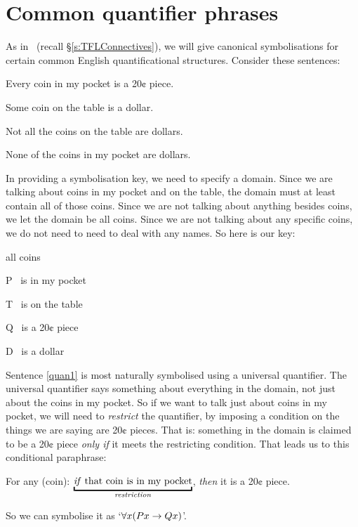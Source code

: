 \section{Common quantifier phrases}
As in \TFL\ (recall §\ref{s:TFLConnectives}), we will give canonical symbolisations for certain common English quantificational structures.
Consider these sentences:
	\begin{earg}
		\item[\ex{quan1}] Every coin in my pocket is a 20¢ piece.
		\item[\ex{quan2}] Some coin on the table is a dollar.
		\item[\ex{quan3}] Not all the coins on the table are dollars.
		\item[\ex{quan4}] None of the coins in my pocket are dollars.
	\end{earg}
In providing a symbolisation key, we need to specify a domain. Since we are talking about coins in my pocket and on the table, the domain must at least contain all of those coins. Since we are not talking about anything besides coins, we let the domain be all coins. Since we are not talking about any specific coins, we do not need to need to deal with any names. So here is our key:
	\begin{ekey}
		\item[\text{domain}] all coins
		\item[P] \blank\ is in my pocket
		\item[T] \blank\ is on the table
		\item[Q] \blank\ is a 20¢ piece
		\item[D] \blank\ is a dollar
	\end{ekey}
Sentence \ref{quan1} is most naturally symbolised using a universal quantifier. The universal quantifier says something about everything in the domain, not just about the coins in my pocket. So if we want to talk just about coins in my pocket, we will need to \emph{restrict} the quantifier, by imposing a condition on the things we are saying are 20¢ pieces. That is: something in the domain is claimed to be a 20¢ piece \emph{only if} it meets the restricting condition. That leads us to this conditional paraphrase: \begin{earg}
	\item[\ex{coinpa}] For any (coin): $\underbracket{\text{\emph{if} that coin is in my pocket}}_{\text{\emph{restriction}}}$, \emph{then} it is a 20¢ piece.
\end{earg} So we can symbolise it as `$\forall x(Px \rightarrow Qx)$'.

